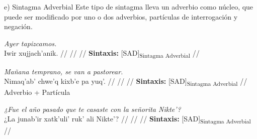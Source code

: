 \documentclass{article}%
\begin{document}
\endgl
\xe
%
\medskip%
e) Sintagma Adverbial %
Este tipo de sintagma lleva un adverbio como núcleo, que puede ser modificado por uno o dos adverbios, partículas de interrogación y negación. %
\par\medskip%
\ex
\textit{Ayer tapizcamos.} \\
\begingl
\gla Iwir xujjach’anik. //
\glb  //
\glc  //
\glft \textbf{Sintaxis:} [SAD]\textsubscript{Sintagma Adverbial} //
\endgl
\xe
%
\medskip%
\par\medskip%
\ex
\textit{Mañana temprano, se van a pastorear.} \\
\begingl
\gla Nimaq’ab’ chwe’q kixb’e pa yuq’. //
\glb  //
\glc  //
\glft \textbf{Sintaxis:} [SAD]\textsubscript{Sintagma Adverbial} //
\endgl
\xe
%
\medskip%
Adverbio + Partícula %
\par\medskip%
\ex
\textit{¿Fue el año pasado que te casaste con la señorita Nikte’?} \\
\begingl
\gla ¿La junab’ir xatk’uli’ ruk’ ali Nikte’? //
\glb  //
\glc  //
\glft \textbf{Sintaxis:} [SAD]\textsubscript{Sintagma Adverbial} //
\endgl
\xe
%
\medskip

%
\end{document}
